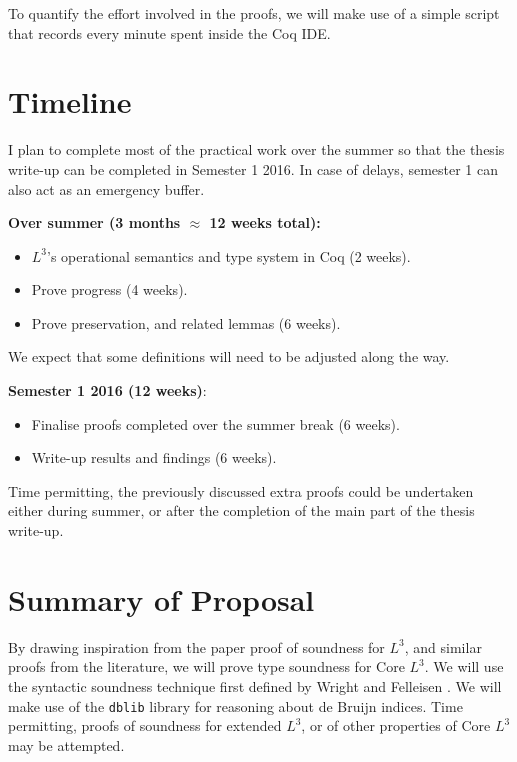 \documentclass[]{unswthesis}
\let\c\texttt
\begin{document}
To quantify the effort involved in the proofs, we will make use of a simple script that records every minute spent inside the Coq IDE.

\section{Timeline}
\label{sec:timeline}

I plan to complete most of the practical work over the summer so that the thesis write-up can be completed in Semester 1 2016. In case of delays, semester 1 can also act as an emergency buffer.

\textbf{Over summer (3 months $\approx$ 12 weeks total):}

\begin{itemize}
\item $L^3$'s operational semantics and type system in Coq (2 weeks).
\item Prove progress (4 weeks).
\item Prove preservation, and related lemmas (6 weeks).
\end{itemize}

We expect that some definitions will need to be adjusted along the way.

\textbf{Semester 1 2016 (12 weeks)}:

\begin{itemize}
\item Finalise proofs completed over the summer break (6 weeks).
\item Write-up results and findings (6 weeks).
\end{itemize}

Time permitting, the previously discussed extra proofs could be undertaken either during summer, or after the completion of the main part of the thesis write-up.

\section{Summary of Proposal}

By drawing inspiration from the paper proof of soundness for $L^3$, and similar proofs from the literature, we will prove type soundness for Core $L^3$. We will use the syntactic soundness technique first defined by Wright and Felleisen \cite{wright94}. We will make use of the \c{dblib} library \cite{dblib13} for reasoning about de Bruijn indices. Time permitting, proofs of soundness for extended $L^3$, or of other properties of Core $L^3$ may be attempted.
\end{document}
